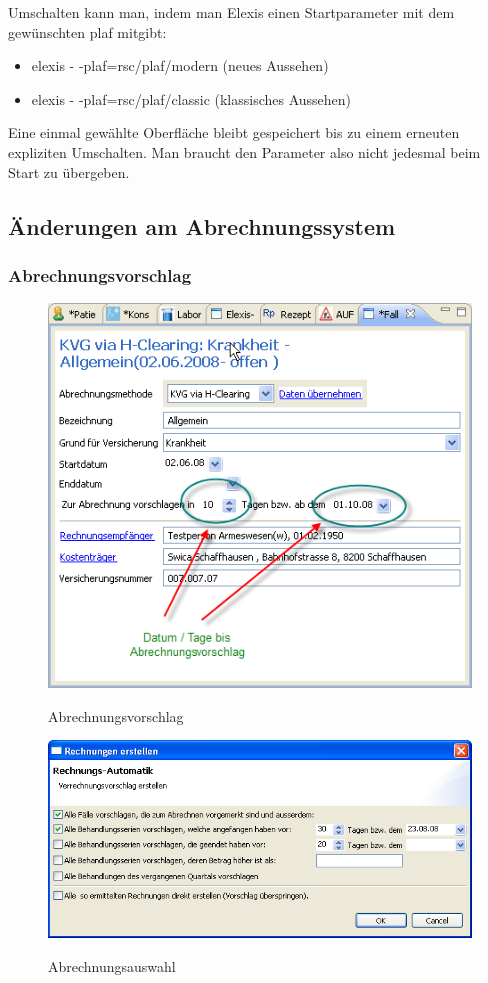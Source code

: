 \documentclass[a4paper]{scrartcl}
\begin{document}
\bigskip
Umschalten kann man, indem man Elexis einen Startparameter mit dem gewünschten plaf mitgibt:

\begin{itemize}
\item elexis - -plaf=rsc/plaf/modern  (neues Aussehen)
\item elexis - -plaf=rsc/plaf/classic (klassisches Aussehen)
\end{itemize}

Eine einmal gewählte Oberfläche bleibt gespeichert bis zu einem erneuten expliziten Umschalten. Man braucht den Parameter also nicht jedesmal beim Start zu übergeben.

\subsection{Änderungen am Abrechnungssystem}
\subsubsection{Abrechnungsvorschlag}
\begin{figure}
  \includegraphics{abrvor1}\\
  \caption{Abrechnungsvorschlag}\label{fig:abrvor1}
\end{figure}

\begin{figure}
  \includegraphics{abrvor2}\\
  \caption{Abrechnungsauswahl}\label{fig:abrvor2}
\end{figure}
\end{document}
